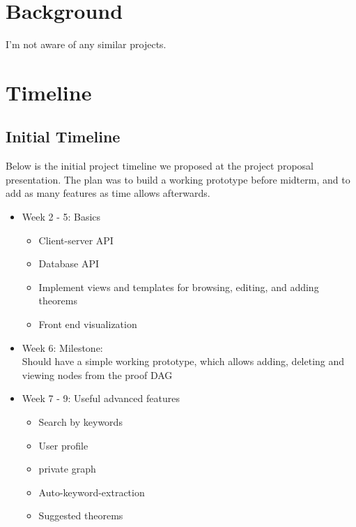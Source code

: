 \documentclass{acm_proc_article-sp}
\begin{document}
\section{Background}
I'm not aware of any similar projects.

\section{Timeline}
\subsection{Initial Timeline}
Below is the initial project timeline we proposed at the project proposal presentation. The plan was to build a working prototype before midterm, and to add as many features as time allows afterwards.  
\begin{itemize}
\item Week 2 - 5: Basics
\begin{itemize}
\item Client-server API
\item Database API
\item Implement views and templates for browsing, editing, and adding theorems
\item Front end visualization
\end{itemize}
\item Week 6: Milestone:\\
Should have a simple working prototype, which allows adding, deleting and viewing nodes from the proof DAG
\item Week 7 - 9: Useful advanced features
\begin{itemize}
\item Search by keywords
\item User profile
\item private graph
\item Auto-keyword-extraction
\item Suggested theorems
\end{itemize}
\end{itemize}
\end{document}
